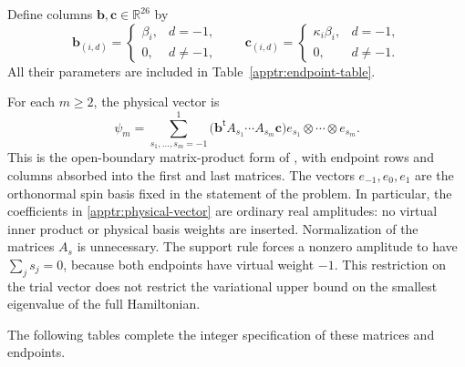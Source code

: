\documentclass[11pt]{article}
\theoremstyle{remark}
\numberwithin{equation}{section}
\begin{document}
Define columns $\mathbf b,\mathbf c\in\mathbb R^{26}$ by
\begin{equation}\label{apptr:endpoints}
 \mathbf b_{(i,d)}=\begin{cases}\beta_i,&d=-1,\\0,&d\ne-1,\end{cases}
 \qquad
 \mathbf c_{(i,d)}=\begin{cases}\kappa_i\beta_i,&d=-1,\\0,&d\ne-1.\end{cases}
\end{equation}
All their parameters are included in Table~\ref{apptr:endpoint-table}.

For each $m\ge2$, the physical vector is
\begin{equation}\label{apptr:physical-vector}
 \psi_m=\sum_{s_1,\ldots,s_m=-1}^{1}
 \bigl(\mathbf b^{\mathsf t}A_{s_1}\cdots A_{s_m}\mathbf c\bigr)
 e_{s_1}\otimes\cdots\otimes e_{s_m}.
\end{equation}
This is the open-boundary matrix-product form of
\cite[Section 3.1, Equation (11)]{PerezGarcia2007}, with endpoint rows
and columns absorbed into the first and last matrices.
The vectors $e_{-1},e_0,e_1$ are the orthonormal spin basis fixed in
the statement of the problem.  In particular, the coefficients in
\eqref{apptr:physical-vector} are ordinary real amplitudes: no virtual
inner product or physical basis weights are inserted.  Normalization
of the matrices $A_s$ is unnecessary.  The support rule forces a
nonzero amplitude to have $\sum_j s_j=0$, because both endpoints have
virtual weight $-1$.  This restriction on the trial vector does not
restrict the variational upper bound on the smallest eigenvalue of
the full Hamiltonian.

The following tables complete the integer specification of these matrices
and endpoints.
\end{document}
